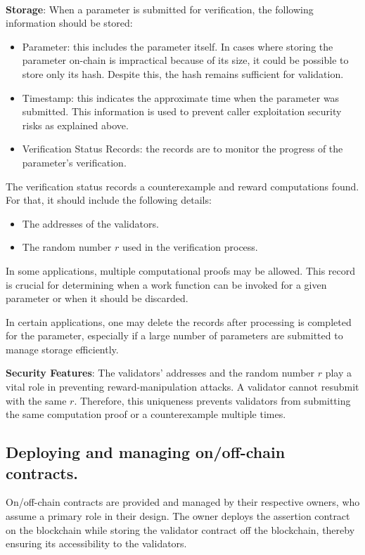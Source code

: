 \documentclass[runningheads]{llncs}
\begin{document}
\\ \textbf{Storage}:
When a parameter is submitted for verification, the following information should be stored:
\begin{itemize}
\item Parameter: this includes the parameter itself. In cases where storing the parameter on-chain is impractical because of its size, it could be possible to store only its hash. Despite this, the hash remains sufficient for validation.
\item Timestamp: this indicates the approximate time when the parameter was submitted. This information is used to prevent caller exploitation security risks as explained above.
\item Verification Status Records: the records are to monitor the progress of the parameter's verification.
\end{itemize}

The verification status records a counterexample and reward computations found. For that, it should include the following details:
\begin{itemize}
    \item The addresses of the validators.
    \item The random number $r$ used in the verification process.
\end{itemize}

In some applications, multiple computational proofs may be allowed. This record is crucial for determining when a work function can be invoked for a given parameter or when it should be discarded. 

In certain applications, one may delete the records after processing is completed for the parameter, especially if a large number of parameters are submitted to manage storage efficiently.

\textbf{Security Features}:
The validators' addresses and the random number $r$ play a vital role in preventing reward-manipulation attacks. A validator cannot resubmit with the same $r$. Therefore, this uniqueness prevents validators from submitting the same computation proof or a counterexample multiple times.
\subsection{Deploying and managing on/off-chain contracts.}
On/off-chain contracts are provided and managed by their respective owners, who assume a primary role in their design. The owner deploys the assertion contract on the blockchain while storing the validator contract off the blockchain, thereby ensuring its accessibility to the validators.
\end{document}
